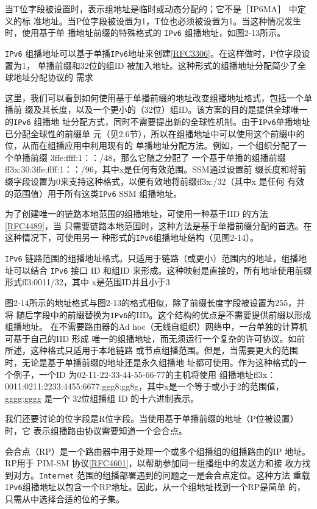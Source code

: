 当T位字段被设置时，表示组地址是临时或动态分配的；它不是［IP6MA］ 中定义的标
准地址。当P位字段被设置为1，T位也必须被设置为1。当这种情况发生时，使用基于单
播地址前缀的特殊格式的 \verb|IPv6| 组播地址，如图2-13所示。

\verb|IPv6| 组播地址可以基于单播\verb|IPv6|地址来创建\href{https://www.rfc-editor.org/rfc/rfc3306}{[RFC3306]}。在这样做时，P位字段设置为1，
单播前缀和32位的组ID 被加入地址。这种形式的组播地址分配简少了全球地址分配协议的
需求

这里，我们可以看到如何使用基于单播前缀的地址改变组播地址格式，包括一个单播前
缀及其长度，以及一个更小的（32位）组ID。该方案的目的是提供全球唯一的\verb|IPv6| 组播地
址分配方式，同时不需要提出新的全球性机制。由于\verb|IPv6|单播地址已分配全球性的前缀单
元（见2.6节），所以在组播地址中可以使用这个前缀中的位，从而在组播应用中利用现有的
单播地址分配方法。例如，一个组织分配了一个单播前缀 3ffe:ffff:1：：/48，那么它随之分配了
一个基于单播的组播前缀 ff3x:30:3ffe:ffff:1：：/96，其中x是任何有效范围。SSM通过设置前
缀长度和将前缀字段设置为0来支持这种格式，以便有效地将前缀ff3x:/32（其中x 是任何
有效的范围值）用于所有这类\verb|IPv6| SSM 组播地址。

为了创建唯一的链路本地范围的组播地址，可使用一种基于IID 的方法\href{https://www.rfc-editor.org/rfc/rfc4489}{[RFC4489]}，当
只需要链路本地范围时，这种方法是基于单播前缀分配的首选。在这种情况下，可使用另一
种形式的\verb|IPv6|组播地址结构（见图2-14）。

\verb|IPv6| 链路范围的组播地址格式。只适用于链路（或更小）范围内的地址，组播地址可以结合
\verb|IPv6| 接口 ID 和组ID 来形成。这种映射是直接的，所有地址使用前缀形式ff3:0011/32，其中
x是范围ID并且小于3

图2-14所示的地址格式与图2-13的格式相似，除了前缀长度字段被设置为255，并将
随后字段中的前缀替换为\verb|IPv6|的IID。这个结构的优点是不需要提供前缀以形成组播地址。
在不需要路由器的Ad hoc（无线自组织）网络中，一台单独的计算机可基于自己的IID 形成
唯一的组播地址，而无须运行一个复杂的许可协议。如前所述，这种格式只适用于本地链路
或节点组播范围。但是，当需要更大的范围时，无论是基于单播前缀的地址还是永久组播地
址都可使用。作为这种格式的一个例子，一个ID 为02-11-22-33-44-55-66-77的主机将使用
组播地址ff3x：0011:0211:2233:4455:6677:ggg8:gg8g，其中x是一个等于或小于2的范围值，
gggg:gggg 是一个 32位组播组 ID 的十六进制表示。

我们还要讨论的位字段是R位字段。当使用基于单播前缀的地址（P位被设置）时，它
表示组播路由协议需要知道一个会合点。

\begin{tcolorbox}
    会合点（RP）是一个路由器中用于处理一个或多个组播组的组播路由的IP
    地址。RP用于 PIM-SM 协议\href{https://www.rfc-editor.org/rfc/rfc4601}{[RFC4601]}，以帮助参加同一组播组中的发送方和接
    收方找到对方。\verb|Internet| 范围的组播部署遇到的问题之一是会合点定位。这种方法
    重载\verb|IPv6|组播地址以包含一个RP地址。因此，从一个组地址找到一个RP是简单
    的，只需从中选择合适的位的子集。
\end{tcolorbox}

